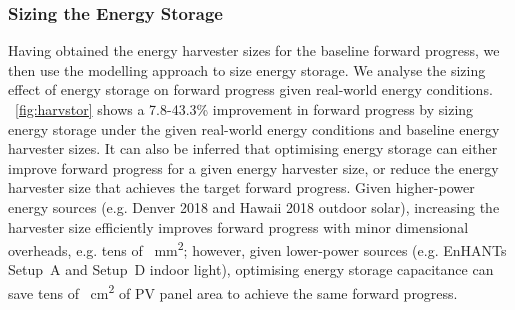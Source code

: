 \subsubsection{Sizing the Energy Storage}

Having obtained the energy harvester sizes for the baseline forward progress, we then use the modelling approach to size energy storage.
We analyse the sizing effect of energy storage on forward progress given real-world energy conditions. \figurename{~\ref{fig:harvstor}} shows a 7.8-43.3\% improvement in forward progress by sizing energy storage under the given real-world energy conditions and baseline energy harvester sizes. 
It can also be inferred that optimising energy storage can either improve forward progress for a given energy harvester size, or reduce the energy harvester size that achieves the target forward progress. Given higher-power energy sources (e.g. Denver 2018 and Hawaii 2018 outdoor solar), increasing the harvester size efficiently improves forward progress with minor dimensional overheads, e.g. tens of \SI{}{\square\milli\meter}; however, given lower-power sources (e.g. EnHANTs Setup~A and Setup~D indoor light), optimising energy storage capacitance can save tens of \SI{}{\square\centi\meter} of PV panel area to achieve the same forward progress.



